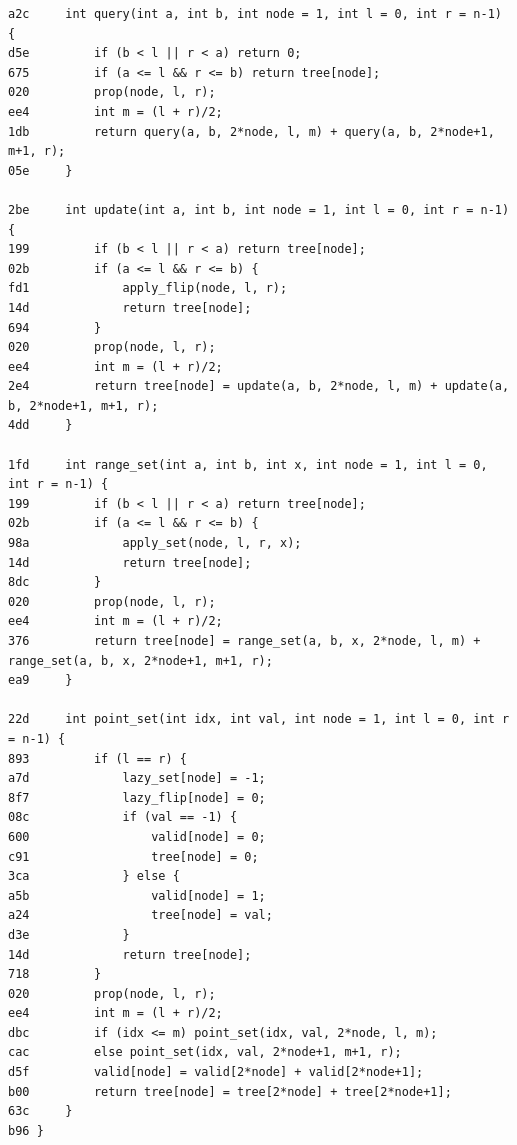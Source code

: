 \documentclass[11pt, a4paper, twoside]{article}
\begin{document}
\begin{lstlisting}
a2c     int query(int a, int b, int node = 1, int l = 0, int r = n-1) {
d5e         if (b < l || r < a) return 0;
675         if (a <= l && r <= b) return tree[node];
020         prop(node, l, r);
ee4         int m = (l + r)/2;
1db         return query(a, b, 2*node, l, m) + query(a, b, 2*node+1, m+1, r);
05e     }
    
2be     int update(int a, int b, int node = 1, int l = 0, int r = n-1) {
199         if (b < l || r < a) return tree[node];
02b         if (a <= l && r <= b) {
fd1             apply_flip(node, l, r);
14d             return tree[node];
694         }
020         prop(node, l, r);
ee4         int m = (l + r)/2;
2e4         return tree[node] = update(a, b, 2*node, l, m) + update(a, b, 2*node+1, m+1, r);
4dd     }
    
1fd     int range_set(int a, int b, int x, int node = 1, int l = 0, int r = n-1) {
199         if (b < l || r < a) return tree[node];
02b         if (a <= l && r <= b) {
98a             apply_set(node, l, r, x);
14d             return tree[node];
8dc         }
020         prop(node, l, r);
ee4         int m = (l + r)/2;
376         return tree[node] = range_set(a, b, x, 2*node, l, m) + range_set(a, b, x, 2*node+1, m+1, r);
ea9     }
    
22d     int point_set(int idx, int val, int node = 1, int l = 0, int r = n-1) {
893         if (l == r) {
a7d             lazy_set[node] = -1;
8f7             lazy_flip[node] = 0;
08c             if (val == -1) {
600                 valid[node] = 0;
c91                 tree[node] = 0;
3ca             } else {
a5b                 valid[node] = 1;
a24                 tree[node] = val;
d3e             }
14d             return tree[node];
718         }
020         prop(node, l, r);
ee4         int m = (l + r)/2;
dbc         if (idx <= m) point_set(idx, val, 2*node, l, m);
cac         else point_set(idx, val, 2*node+1, m+1, r);
d5f         valid[node] = valid[2*node] + valid[2*node+1];
b00         return tree[node] = tree[2*node] + tree[2*node+1];
63c     }
b96 }
\end{lstlisting}
\end{document}

